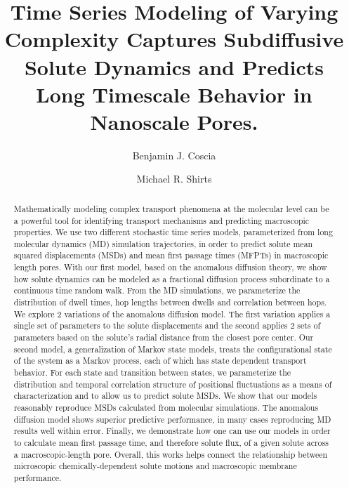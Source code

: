 \documentclass{article}
\title{Time Series Modeling of Varying Complexity Captures Subdiffusive Solute Dynamics
and Predicts Long Timescale Behavior in Nanoscale Pores.}
\author{Benjamin J. Coscia \and Michael R. Shirts}
\begin{document}
  \graphicspath{{./figures/}}
  \maketitle
  
  \begin{abstract}
  Mathematically modeling complex transport phenomena at the molecular level 
  can be a powerful tool for identifying transport mechanisms and predicting
  macroscopic properties. We use two different stochastic time series models,
  parameterized from long molecular dynamics (MD) simulation trajectories, in
  order to predict solute mean squared displacements (MSDs) and mean first 
  passage times (MFPTs) in macroscopic length pores. With our first model, 
  based on the anomalous diffusion theory, we show how solute dynamics can be
  modeled as a fractional diffusion process subordinate to a continuous time 
  random walk. From the MD simulations, we parameterize the distribution of 
  dwell times, hop lengths between dwells and correlation between hops. We 
  explore 2 variations of the anomalous diffusion model. The first variation
  applies a single set of parameters to the solute displacements and the second
  applies 2 sets of parameters based on the solute's radial distance from the closest pore center.
  Our second model, a generalization of Markov state models, treats the configurational
  state of the system as a Markov process, each of which has state dependent 
  transport behavior. For each state and transition between states, we parameterize
  the distribution and temporal correlation structure of positional fluctuations as
  a means of characterization and to allow us to predict solute MSDs.
  We show that our models reasonably reproduce MSDs calculated from molecular 
  simulations. The anomalous diffusion model shows superior predictive performance, 
  in many cases reproducing MD results well within error. Finally, we demonstrate 
  how one can use our models in order to calculate mean first passage time, and 
  therefore solute flux, of a given solute across a macroscopic-length pore. Overall,
  this works helps connect the relationship between microscopic chemically-dependent
  solute motions and macroscopic membrane performance.
  

  \end{abstract}
\end{document}
